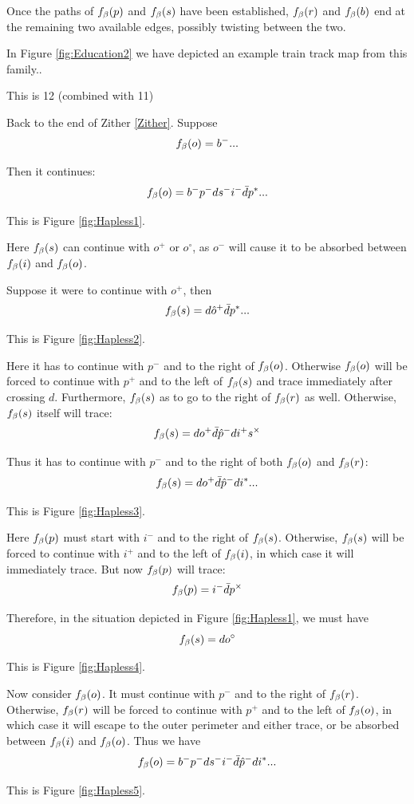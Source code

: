 Once the paths of $f_\beta(p)$ and $f_\beta(s)$ have been established, $f_\beta(r)$ and $f_\beta(b)$ end at the remaining two available edges, possibly twisting between the two. 

In Figure \ref{fig:Education2} we have depicted an example train track map from this family..


This is 12 (combined with 11)

\label{Hapless}
Back to the end of Zither \ref{Zither}. Suppose
\[
f_\beta(o) = b^-...
\]

Then it continues:
\[
f_\beta(o) = b^- p^- d s^- i^- \bar{d} p^*...
\]

This is Figure \ref{fig:Hapless1}.

Here $f_\beta(s)$ can continue with $o^+$ or $o^\circ$, as $o^-$ will cause it to be absorbed between $f_\beta(i)$ and $f_\beta(o)$.

Suppose it were to continue with $o^+$, then
\[
f_\beta(s) = d \hat{o}^+ \bar{d} p^*...
\]

This is Figure \ref{fig:Hapless2}.

Here it has to continue with $p^-$ and to the right of $f_\beta(o)$. Otherwise $f_\beta(o)$ will be forced to continue with $p^+$ and to the left of $f_\beta(s)$ and trace immediately after crossing $d$. Furthermore, $f_\beta(s)$ as to go to the right of $f_\beta(r)$ as well. Otherwise, $f_\beta(s)$ itself will trace:
\[
f_\beta(s) = d o^+ \bar{d} \hat{p}^- d i^+ s^\times
\]

Thus it has to continue with $p^-$ and to the right of both $f_\beta(o)$ and $f_\beta(r)$:
\[
f_\beta(s) = d o^+ \bar{d} \hat{p}^- d i^*...
\]

This is Figure \ref{fig:Hapless3}.

Here $f_\beta(p)$ must start with $i^-$ and to the right of $f_\beta(s)$. Otherwise, $f_\beta(s)$ will be forced to continue with $i^+$ and to the left of $f_\beta(i)$, in which case it will immediately trace. But now $f_\beta(p)$ will trace:
\[
f_\beta(p) = i^- \bar{d} p^\times
\]

Therefore, in the situation depicted in Figure \ref{fig:Hapless1}, we must have
\[
f_\beta(s) = d o^\circ
\]

This is Figure \ref{fig:Hapless4}.

Now consider $f_\beta(o)$. It must continue with $p^-$ and to the right of $f_\beta(r)$. Otherwise, $f_\beta(r)$ will be forced to continue with $p^+$ and to the left of $f_\beta(o)$, in which case it will escape to the outer perimeter and either trace, or be absorbed between $f_\beta(i)$ and $f_\beta(o)$. Thus we have
\[
f_\beta(o) = b^- p^- d s^- i^- \bar{d} \hat{p}^- d i^*...
\]

This is Figure \ref{fig:Hapless5}.

